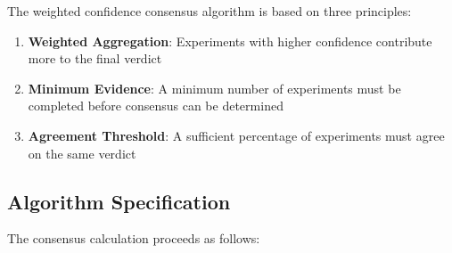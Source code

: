 \documentclass{book}
\begin{document}
The weighted confidence consensus algorithm is based on three principles:

\begin{enumerate}
    \item \textbf{Weighted Aggregation}: Experiments with higher confidence contribute more to the final verdict
    \item \textbf{Minimum Evidence}: A minimum number of experiments must be completed before consensus can be determined
    \item \textbf{Agreement Threshold}: A sufficient percentage of experiments must agree on the same verdict
\end{enumerate}

\subsection{Algorithm Specification}

The consensus calculation proceeds as follows:
\end{document}
